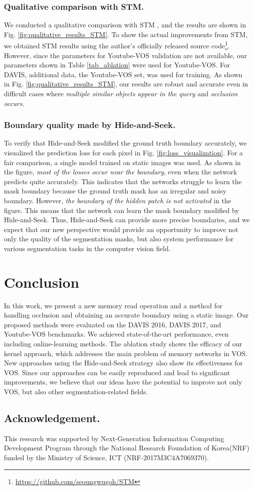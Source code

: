 \documentclass[runningheads]{llncs}
\begin{document}
\subsubsection{Qualitative comparison with STM.}
We conducted a qualitative comparison with STM \cite{Oh_2019_ICCV}, and the results are shown in Fig. \ref{fig:qualitative_results_STM}. To show the actual improvements from STM, we obtained STM results using the author's officially released source code\footnote{\url{https://github.com/seoungwugoh/STM}}. However, since the parameters for Youtube-VOS validation are not available, our parameters shown in Table \ref{tab_ablation} were used for Youtube-VOS. For DAVIS, additional data, the Youtube-VOS set, was used for training. As shown in Fig. \ref{fig:qualitative_results_STM}, our results are robust and accurate even in difficult cases where \textit{multiple similar objects appear in the query} and \textit{occlusion occurs}.

\subsubsection{Boundary quality made by Hide-and-Seek.}
To verify that Hide-and-Seek modified the ground truth boundary accurately, we visualized the prediction loss for each pixel in Fig. \ref{fig:loss_visualization}. For a fair comparison, a single model trained on static images was used. As shown in the figure, \textit{most of the losses occur near the boundary}, even when the network predicts quite accurately. This indicates that the networks struggle to learn the mask boundary because the ground truth mask has an irregular and noisy boundary. However, \textit{the boundary of the hidden patch is not activated} in the figure. This means that the network can learn the mask boundary modified by Hide-and-Seek. Thus, Hide-and-Seek can provide more precise boundaries, and we expect that our new perspective would provide an opportunity to improve not only the quality of the segmentation masks, but also system performance for various segmentation tasks in the computer vision field.



\section{Conclusion}
\label{s5}
In this work, we present a new memory read operation and a method for handling occlusion and obtaining an accurate boundary using a static image. Our proposed methods were evaluated on the DAVIS 2016, DAVIS 2017, and Youtube-VOS benchmarks. We achieved state-of-the-art performance, even including online-learning methods. The ablation study shows the efficacy of our kernel approach, which addresses the main problem of memory networks in VOS. New approaches using the Hide-and-Seek strategy also show its effectiveness for VOS. Since our approaches can be easily reproduced and lead to significant improvements, we believe that our ideas have the potential to improve not only VOS, but also other segmentation-related fields.


\subsection*{Acknowledgement.}
This research was supported by Next-Generation Information Computing Development Program through the National Research Foundation of Korea(NRF) funded by the Ministry of Science, ICT (NRF-2017M3C4A7069370).

\clearpage


\end{document}
